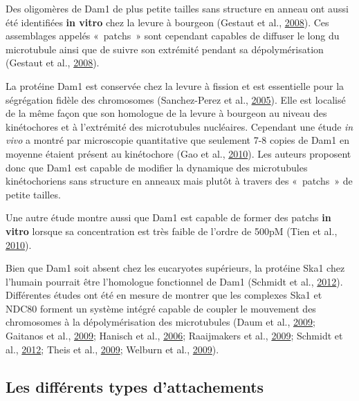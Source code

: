\documentclass[12pt,a4paper,twoside,openright]{book}
\begin{document}
Des oligomères de Dam1 de plus petite tailles sans structure en anneau
ont aussi été identifiées \textbf{in vitro} chez la levure à bourgeon
(Gestaut et al., \protect\hyperlink{ref-Gestaut2008}{2008}). Ces
assemblages appelés «~patchs~» sont cependant capables de diffuser le
long du microtubule ainsi que de suivre son extrémité pendant sa
dépolymérisation (Gestaut et al.,
\protect\hyperlink{ref-Gestaut2008}{2008}).

La protéine Dam1 est conservée chez la levure à fission et est
essentielle pour la ségrégation fidèle des chromosomes (Sanchez-Perez et
al., \protect\hyperlink{ref-Sanchez-Perez2005}{2005}). Elle est localisé
de la même façon que son homologue de la levure à bourgeon au niveau des
kinétochores et à l'extrémité des microtubules nucléaires. Cependant une
étude \emph{in vivo} a montré par microscopie quantitative que seulement
7-8 copies de Dam1 en moyenne étaient présent au kinétochore (Gao et
al., \protect\hyperlink{ref-Gao2010}{2010}). Les auteurs proposent donc
que Dam1 est capable de modifier la dynamique des microtubules
kinétochoriens sans structure en anneaux mais plutôt à travers des
«~patchs~» de petite tailles.

Une autre étude montre aussi que Dam1 est capable de former des patchs
\textbf{in vitro} lorsque sa concentration est très faible de l'ordre de
500pM (Tien et al., \protect\hyperlink{ref-Tien2010}{2010}).

Bien que Dam1 soit absent chez les eucaryotes supérieurs, la protéine
Ska1 chez l'humain pourrait être l'homologue fonctionnel de Dam1
(Schmidt et al., \protect\hyperlink{ref-Schmidt2012}{2012}). Différentes
études ont été en mesure de montrer que les complexes Ska1 et NDC80
forment un système intégré capable de coupler le mouvement des
chromosomes à la dépolymérisation des microtubules (Daum et al.,
\protect\hyperlink{ref-Daum2009}{2009}; Gaitanos et al.,
\protect\hyperlink{ref-Gaitanos2009}{2009}; Hanisch et al.,
\protect\hyperlink{ref-Hanisch2006}{2006}; Raaijmakers et al.,
\protect\hyperlink{ref-Raaijmakers2009}{2009}; Schmidt et al.,
\protect\hyperlink{ref-Schmidt2012}{2012}; Theis et al.,
\protect\hyperlink{ref-Theis2009}{2009}; Welburn et al.,
\protect\hyperlink{ref-Welburn2009}{2009}).

\subsection{Les différents types
d'attachements}\label{sec:attachments-type}
\end{document}
